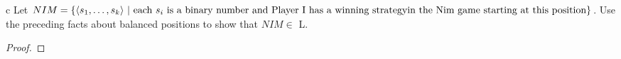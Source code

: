 \documentclass[11pt]{article}
\begin{document}
\begin{problem}[Part]{c}
Let $NIM = \{\langle s_1, \ldots , s_k \rangle \ | \ \text{each } s_i \text{ is a binary number and Player I has a winning
strategy} \\ \text{in the Nim game starting at this position}\}$. Use the preceding facts about balanced positions to show that $NIM \in$ L.
\end{problem}

\begin{proof}
\end{proof}
\end{document}
